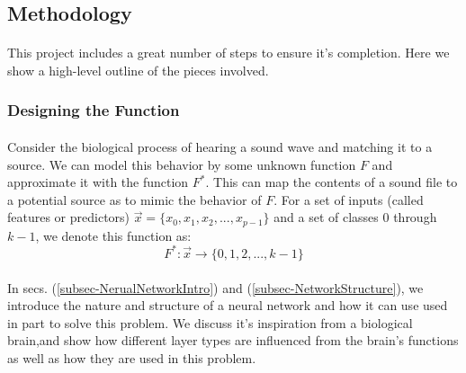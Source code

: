 \documentclass[12pt,letterpaper]{article}
\begin{document}

\newpage
\subsection{Methodology}
\label{sec-Methodology}

\paragraph*{}This project includes a great number of steps to ensure it's completion. Here we show a high-level outline of the pieces involved.


\subsubsection{Designing the Function}

\paragraph*{}Consider the biological process of hearing a sound wave and matching it to a source. We can model this behavior by some unknown function $F$ and approximate it with the function $F^*$. This can map the contents of a sound file to a potential source as to mimic the behavior of $F$. For a set of inputs (called features or predictors) $\vec{x} = \big\{ x_0 , x_1 , x_2 , ... , x_{p-1} \big\}$ and a set of classes $0$ through $k-1$, we denote this function as:
\begin{equation}
\label{eqn-MappingFunction}
F^*: \vec{x} \rightarrow \big\{ 0 , 1 , 2 , ... , k-1 \big\}
\end{equation}

\paragraph*{}In secs. (\ref{subsec-NerualNetworkIntro}) and (\ref{subsec-NetworkStructure}), we introduce the nature and structure of a neural network and how it can use used in part to solve this problem. We discuss it's inspiration from a biological brain,and show how different layer types are influenced from the brain's functions as well as how they are used in this problem.

\end{document}
